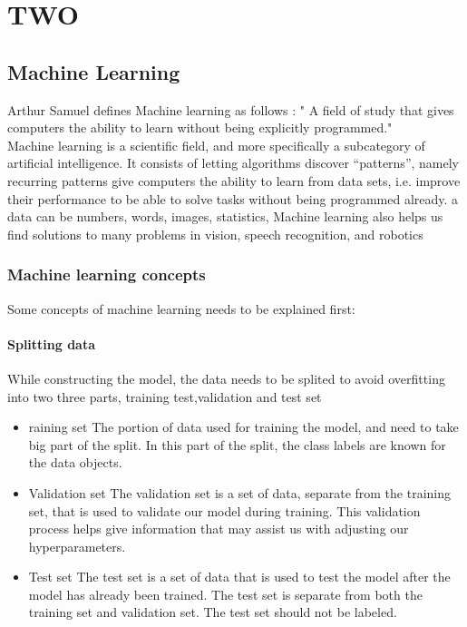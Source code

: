 \let\textcircled=\pgftextcircled
\chapter{TWO}
\label{chap:intro}
\section{Machine Learning}
Arthur Samuel defines Machine learning as follows : " A field of study that gives computers the ability to learn without being explicitly programmed."\cite{art4} \\

Machine learning is a scientific field, and more specifically a subcategory of artificial intelligence. It consists of letting algorithms discover “patterns”, namely recurring patterns give computers the ability to learn from data sets, i.e. improve their performance to be able to solve tasks without being programmed already.
a data can be numbers, words, images, statistics, Machine learning also helps us find solutions to many problems in vision, speech recognition, and robotics\cite{book2}
\subsection{Machine learning concepts }
Some concepts of machine learning needs to be explained first:
\subsubsection{Splitting data}
While constructing the model, the data needs to be splited to avoid overfitting into two three parts, training test,validation and test set 
\begin{itemize}
    \item raining set The portion of data used for training the model, and need to take big part of the split. In this part of the split, the class labels are known for the data objects.  
    \item Validation set The validation set is a set of data, separate from the training set, that is used to validate our model during training. This validation process helps give information that may assist us with adjusting our hyperparameters.
    \item Test set The test set is a set of data that is used to test the model after the model has already been trained. The test set is separate from both the training set and validation set. The test set should not be labeled. 

\end{itemize}
